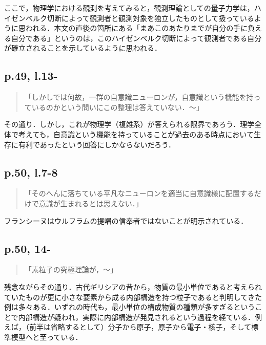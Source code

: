 \documentclass[10pt, a5paper, twoside]{jsarticle}
\theoremstyle{definition}
\begin{document}
                ここで，物理学における観測を考えてみると，観測理論としての量子力学は，ハイゼンベルク切断によって観測者と観測対象を独立したものとして扱っているように思われる．本文の直後の箇所にある「まあこのあたりまでが自分の手に負える自分である」というのは，このハイゼンベルク切断によって観測者である自分が確立されることを示しているように思われる．

            \subsection{p.49, l.13-}

                \begin{quote}

                    「しかしでは何故，一群の自意識ニューロンが，自意識という機能を持っているのかという問いにこの整理は答えていない．〜」

                \end{quote}

                その通り．しかし，これが物理学（複雑系）が答えられる限界であろう．理学全体で考えても，自意識という機能を持っていることが過去のある時点において生存に有利であったという回答にしかならないだろう．

            \subsection{p.50, l.7-8}

                \begin{quote}

                    「そのへんに落ちている平凡なニューロンを適当に自意識様に配置するだけで意識が生まれるとは思えない．」

                \end{quote}

                フランシーヌはウルフラムの提唱の信奉者ではないことが明示されている．

            \subsection{p.50, 14-}

                \begin{quote}

                    「素粒子の究極理論が，〜」

                \end{quote}

                残念ながらその通り．古代ギリシアの昔から，物質の最小単位であると考えられていたものが更に小さな要素から成る内部構造を持つ粒子であると判明してきた例は多々ある．いずれの時代も，最小単位の構成物質の種類が多すぎるということで内部構造が疑われ，実際に内部構造が発見されるという過程を経ている．例えば，（前半は省略するとして）分子から原子，原子から電子・核子，そして標準模型へと至っている．
\end{document}
